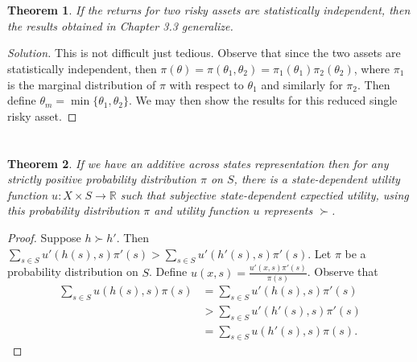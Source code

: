 \documentclass[12pt]{article}
\newtheorem{thm}{Theorem}[section]
\theoremstyle{definition}
\theoremstyle{remark}
\def\RR{\mathbb{R}}
\begin{document}
\section{}
\begin{thm}
  If the returns for two risky assets are statistically independent, then the results obtained in Chapter 3.3 generalize.
\end{thm}
\begin{proof}[Solution]
  This is not difficult just tedious. Observe that since the two assets are statistically independent, then $\pi(\theta) = \pi(\theta_1, \theta_2) = \pi_1(\theta_1)\pi_2(\theta_2)$, where $\pi_1$ is the marginal distribution of $\pi$ with respect to $\theta_1$ and similarly for $\pi_2$.
  Then define $\theta_m = \min \{ \theta_1, \theta_2 \}$. We may then show the results for this reduced single risky asset.
\end{proof}
%
%
\section{}
\begin{thm}
  If we have an \emph{additive across states representation} then for any strictly positive probability distribution $\pi$ on $S$, there is a state-dependent utility function $u: X \times S \rightarrow \RR$ such that subjective state-dependent expectied utility, using this probability distribution $\pi$ and utility function $u$ represents $\succ$.
\end{thm}
\begin{proof}
  Suppose $h \succ h'$. Then $\sum_{s \in S}u'(h(s),s)\pi'(s) > \sum_{s \in S}u'(h'(s),s)\pi'(s)$. Let $\pi$ be a probability distribution on $S$. Define $u(x, s) = \frac{u'(x, s)\pi'(s)}{\pi(s)}$. Observe that
  \begin{align*}
    \sum_{s \in S} u(h(s), s) \pi(s) &= \sum_{s \in S} u'(h(s), s)\pi'(s) \\
    &> \sum_{s \in S} u'(h'(s), s)\pi'(s) \\
    &= \sum_{s \in S} u(h'(s), s) \pi(s).
  \end{align*}
\end{proof}
%
%
\end{document}

